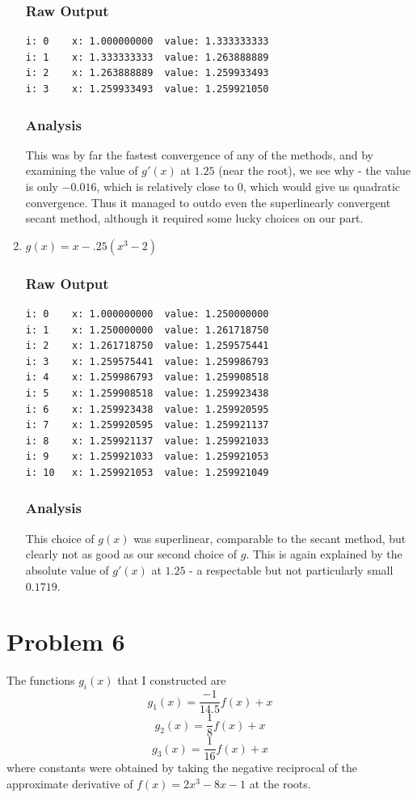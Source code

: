 \documentclass[11pt]{article} %
\begin{document}
\begin{enumerate}
\subsubsection*{Raw Output}
\begin{verbatim}
i: 0	x: 1.000000000	value: 1.333333333
i: 1	x: 1.333333333	value: 1.263888889
i: 2	x: 1.263888889	value: 1.259933493
i: 3	x: 1.259933493	value: 1.259921050
\end{verbatim}
\subsubsection*{Analysis}
This was by far the fastest convergence of any of the methods, and by examining the value of $g'(x)$ at $1.25$ (near the root), we see why - the value is only $-0.016$, which is relatively close to 0, which would give us quadratic convergence. Thus it managed to outdo even the superlinearly convergent secant method, although it required some lucky choices on our part.
\item $g(x) = x - .25(x^3 - 2)$
\subsubsection*{Raw Output}
\begin{verbatim}
i: 0	x: 1.000000000	value: 1.250000000
i: 1	x: 1.250000000	value: 1.261718750
i: 2	x: 1.261718750	value: 1.259575441
i: 3	x: 1.259575441	value: 1.259986793
i: 4	x: 1.259986793	value: 1.259908518
i: 5	x: 1.259908518	value: 1.259923438
i: 6	x: 1.259923438	value: 1.259920595
i: 7	x: 1.259920595	value: 1.259921137
i: 8	x: 1.259921137	value: 1.259921033
i: 9	x: 1.259921033	value: 1.259921053
i: 10	x: 1.259921053	value: 1.259921049
\end{verbatim}
\subsubsection*{Analysis}
This choice of $g(x)$ was superlinear, comparable to the secant method, but clearly not as good as our second choice of $g$. This is again explained by the absolute value of $g'(x)$ at $1.25$ - a respectable but not particularly small $0.1719$.
\end{enumerate}

\section*{Problem 6}
The functions $g_i(x)$ that I constructed are 
$$g_1(x) = \frac{-1}{14.5}f(x) + x$$
$$g_2(x) = \frac{1}{8}f(x) + x$$
$$g_3(x) = \frac{1}{16}f(x) + x$$
where constants were obtained by taking the negative reciprocal of the approximate derivative of $f(x) = 2x^3 - 8x -1$ at
the roots.
\end{document}

